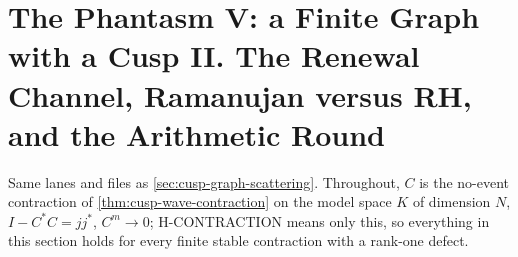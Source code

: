 
\section{The Phantasm V: a Finite Graph with a Cusp II. The Renewal Channel, Ramanujan versus RH, and the Arithmetic Round}
\label{sec:cusp-graph-renewal}

Same lanes and files as \cref{sec:cusp-graph-scattering}. Throughout, $C$ is the no-event contraction of
\cref{thm:cusp-wave-contraction} on the model space $K$ of dimension $N$, $I-C^{*}C = jj^{*}$, $C^m\to0$;
H-CONTRACTION means only this, so everything in this section holds for every finite stable contraction with
a rank-one defect.

